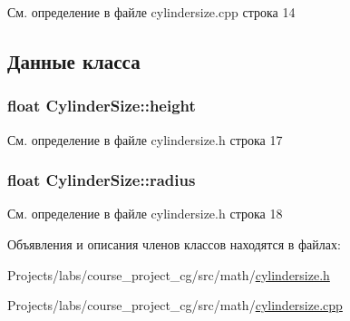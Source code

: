 См. определение в файле cylindersize.\+cpp строка 14



\subsection{Данные класса}
\subsubsection[{\texorpdfstring{height}{height}}]{\setlength{\rightskip}{0pt plus 5cm}float Cylinder\+Size\+::height\hspace{0.3cm}{\ttfamily [private]}}\hypertarget{class_cylinder_size_a64a31d3ecef008bc999f02797aa73ebf}{}\label{class_cylinder_size_a64a31d3ecef008bc999f02797aa73ebf}


См. определение в файле cylindersize.\+h строка 17

\subsubsection[{\texorpdfstring{radius}{radius}}]{\setlength{\rightskip}{0pt plus 5cm}float Cylinder\+Size\+::radius\hspace{0.3cm}{\ttfamily [private]}}\hypertarget{class_cylinder_size_ac12aa459995c8467cf96d978b05e7ee5}{}\label{class_cylinder_size_ac12aa459995c8467cf96d978b05e7ee5}


См. определение в файле cylindersize.\+h строка 18



Объявления и описания членов классов находятся в файлах\+:\begin{DoxyCompactItemize}
\item 
Projects/labs/course\+\_\+project\+\_\+cg/src/math/\hyperlink{cylindersize_8h}{cylindersize.\+h}\item 
Projects/labs/course\+\_\+project\+\_\+cg/src/math/\hyperlink{cylindersize_8cpp}{cylindersize.\+cpp}\end{DoxyCompactItemize}
